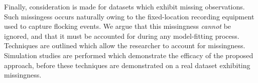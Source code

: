 \begin{center}
\begin{minipage}{0.9\textwidth}
    Finally, consideration is made for datasets which exhibit missing
    observations. Such missingess occurs naturally owing to the fixed-location
    recording equipment used to capture flocking events. We argue that this
    missingness \emph{cannot} be ignored, and that it must be accounted for
    during any model-fitting process. Techniques are outlined which allow the
    researcher to account for missingness. Simulation studies are performed
    which demonstrate the efficacy of the proposed approach, before these
    techniques are demonstrated on a real dataset exhibiting missingness.

  \end{minipage}

\end{center}

\vspace*{\fill}

\cleardoublepage
